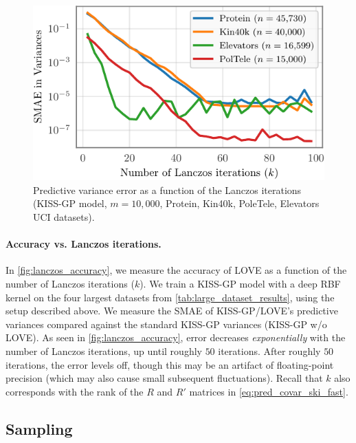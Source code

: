 \begin{figure}[t!]
  \centering
  \includegraphics[width=0.95\columnwidth]{figures/lanczos_accuracy.pdf}
  \vspace{-2ex}
  \caption{
    Predictive variance error as a function of the Lanczos iterations (KISS-GP model, $m=10,\!000$, Protein, Kin40k, PoleTele, Elevators  UCI datasets).
    \label{fig:lanczos_accuracy}
  }
  \vspace{-1ex}
\end{figure}

\paragraph{Accuracy vs. Lanczos iterations.}
In \autoref{fig:lanczos_accuracy}, we measure the accuracy of LOVE{} as a function of the number of Lanczos iterations ($k$).
We train a KISS-GP model with a deep RBF kernel on the four largest datasets from \autoref{tab:large_dataset_results}, using the setup described above.
We measure the SMAE of KISS-GP/LOVE's predictive variances compared against the standard KISS-GP variances (KISS-GP w/o LOVE).
As seen in \autoref{fig:lanczos_accuracy}, error decreases \emph{exponentially} with the number of Lanczos iterations, up until roughly $50$ iterations.
After roughly $50$ iterations, the error levels off, though this may be an artifact of floating-point precision (which may also cause small subsequent fluctuations).
Recall that $k$ also corresponds with the rank of the $R$ and $R'$ matrices in \eqref{eq:pred_covar_ski_fast}.

\subsection{Sampling}

